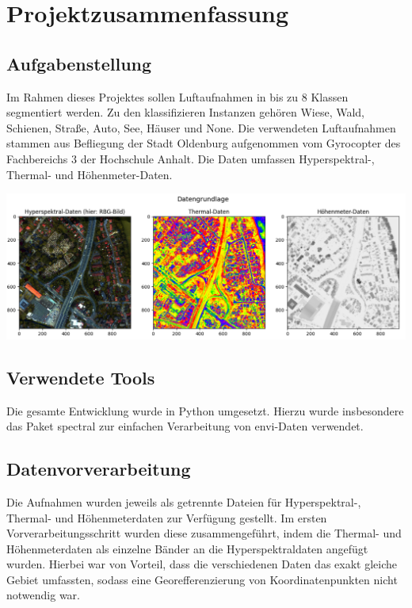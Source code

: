 \newpage %

\chapter{Projektzusammenfassung}\thispagestyle{fancy}

\section{Aufgabenstellung}
Im Rahmen dieses Projektes sollen Luftaufnahmen in bis zu 8 Klassen segmentiert werden.
Zu den klassifizieren Instanzen gehören Wiese, Wald, Schienen, Straße, Auto, See, Häuser und None.
Die verwendeten Luftaufnahmen stammen aus Befliegung der Stadt Oldenburg aufgenommen vom Gyrocopter des Fachbereichs 3
der Hochschule Anhalt.
Die Daten umfassen Hyperspektral-, Thermal- und Höhenmeter-Daten.\\

\begin{center}
\includegraphics[width=15cm]{../../data/Datengrundlage}
\end{center}

\section{Verwendete Tools}
Die gesamte Entwicklung wurde in Python umgesetzt.
Hierzu wurde insbesondere das Paket spectral zur einfachen Verarbeitung von envi-Daten verwendet.

\section{Datenvorverarbeitung}
Die Aufnahmen wurden jeweils als getrennte Dateien für Hyperspektral-, Thermal- und Höhenmeterdaten zur Verfügung gestellt.
Im ersten Vorverarbeitungsschritt wurden diese zusammengeführt, indem die Thermal- und Höhenmeterdaten als einzelne Bänder an die Hyperspektraldaten angefügt wurden.
Hierbei war von Vorteil, dass die verschiedenen Daten das exakt gleiche Gebiet umfassten, sodass eine Georefferenzierung von Koordinatenpunkten nicht notwendig war.\\

